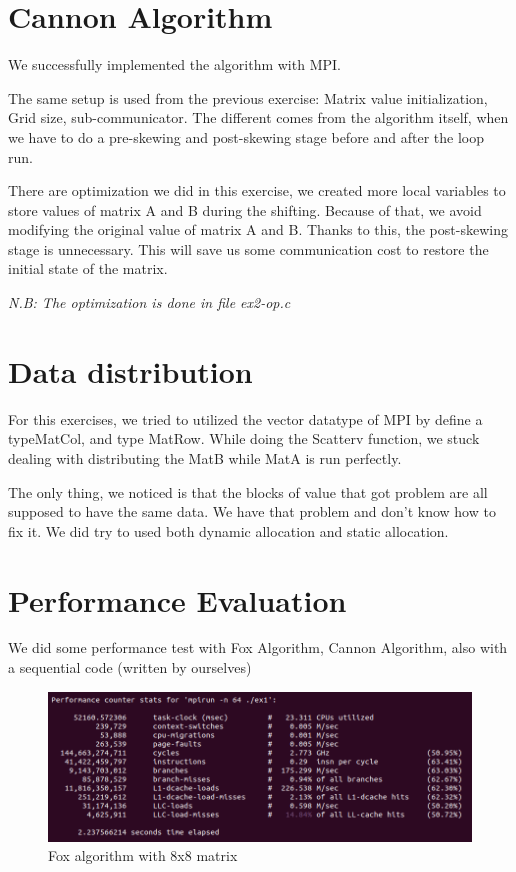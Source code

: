 \documentclass{article}
\begin{document}
\section{Cannon Algorithm}
We successfully implemented the algorithm with MPI. 
\bigskip

The same setup is used from the previous exercise: Matrix value initialization, Grid size, sub-communicator. The different comes from the algorithm itself, when we have to do a pre-skewing and post-skewing stage before and after the loop run. 

\bigskip
There are optimization we did in this exercise, we created more local variables to store values of matrix A and B during the shifting. Because of that, we avoid modifying the original value of matrix A and B. Thanks to this, the post-skewing stage is unnecessary. This will save us some communication cost to restore the initial state of the matrix.

\bigskip
\textit{N.B: The optimization is done in file ex2-op.c}
\section{Data distribution}
For this exercises, we tried to utilized the vector datatype of MPI by define a typeMatCol, and type MatRow. While doing the Scatterv function, we stuck dealing with distributing the MatB while MatA is run perfectly.

The only thing, we noticed is that the blocks of value that got problem are all supposed to have the same data. We have that problem and don't know how to fix it. We did try to used both dynamic allocation and static allocation.
\section{Performance Evaluation}

We did some performance test with Fox Algorithm, Cannon Algorithm, also with a sequential code (written by ourselves)

\begin{figure}[H]
	\includegraphics[width=\textwidth]{ex1.png}
	\caption{Fox algorithm with 8x8 matrix}
\end{figure}
\end{document}
